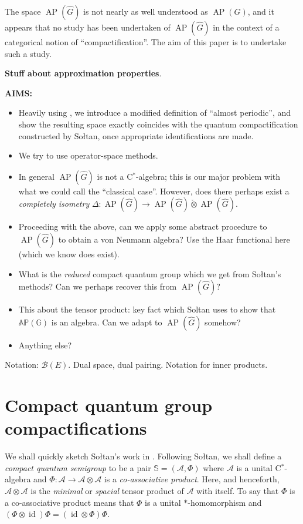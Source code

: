 \documentclass[twoside,a4paper]{article}
\theoremstyle{definition}
\theoremstyle{remark}
\newcommand{\ap}{{\operatorname{AP}}}
\newcommand{\AP}{{\mathbb{AP}}}
\newcommand{\inten}{\check\otimes}
\newcommand{\mc}{\mathcal}
\newcommand{\id}{\operatorname{id}}
\begin{document}
The space $\ap(\hat G)$ is not nearly as well understood as $\ap(G)$,
and it appears that no study has been undertaken of $\ap(\hat G)$ in
the context of a categorical notion of ``compactification''.  The aim
of this paper is to undertake such a study.

\textbf{Stuff about approximation properties}.

\textbf{AIMS:}
\begin{itemize}
\item Heavily using \cite{chou}, we introduce a modified definition
of ``almost periodic'', and show the resulting space exactly
coincides with the quantum compactification constructed by
So{\l}tan, once appropriate identifications are made.
\item We try to use operator-space methods.
\item In general $\ap(\hat G)$ is not a C$^*$-algebra; this is our major
problem with what we could call the ``classical case''.  However, does there
perhaps exist a \emph{completely isometry} $\Delta:\ap(\hat G)\rightarrow
\ap(\hat G)\inten\ap(\hat G)$.
\item Proceeding with the above, can we apply some abstract procedure to
$\ap(\hat G)$ to obtain a von Neumann algebra?  Use the Haar functional here
(which we know does exist).
\item What is the \emph{reduced} compact quantum group which we get from
So{\l}tan's methods?  Can we perhaps recover this from $\ap(\hat G)$?
\item This about the tensor product: key fact which Soltan uses to show
that $\AP(\mathbb G)$ is an algebra.  Can we adapt to $\ap(\hat G)$ somehow?
\item Anything else?
\end{itemize}

Notation: $\mc B(E)$.  Dual space, dual pairing.  Notation for inner products.






\section{Compact quantum group compactifications}

We shall quickly sketch So\l tan's work in \cite{soltan}.
Following So\l tan, we shall define a \emph{compact quantum semigroup}
to be a pair $\mathbb S=(\mc A,\Phi)$ where $\mc A$ is a unital C$^*$-algebra
and $\Phi:\mc A\rightarrow\mc A\otimes\mc A$ is a \emph{co-associative
product}.  Here, and henceforth, $\mc A\otimes\mc A$ is the \emph{minimal}
or \emph{spacial} tensor product of $\mc A$ with itself.  To say that $\Phi$ is a
co-associative product means that $\Phi$ is a unital $*$-homomorphism and
$(\Phi\otimes\id)\Phi = (\id\otimes\Phi)\Phi$.
\end{document}
